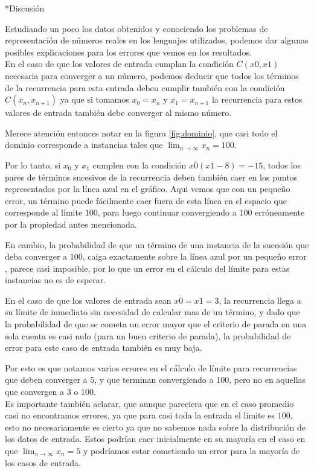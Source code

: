 \documentclass[12pt,titlepage]{article}
\newenvironment{usection}[1]{\newpage\begin{section}*{#1}	\addcontentsline{toc}{section}{#1}}{\end{section}}
\begin{document}
	\begin{usection}{Discusión}

		Estudiando un poco los datos obtenidos
		y conociendo los problemas de representación de números reales
		en los lenguajes utilizados, podemos dar algunas posibles explicaciones
		para los errores que vemos en los resultados. \\

		En el caso de que los valores de entrada cumplan la condición $C(x0,x1)$
		necesaria para converger a un número, podemos deducir que
		todos los términos de la recurrencia para esta entrada
		deben cumplir también con la condición $C(x_n,x_{n+1})$ ya que
		si tomamos $x_0 = x_n$ y $x_1 = x_{n+1}$ la recurrencia
		para estos valores de entrada también debe converger al mismo número.

		Merece atención entonces notar en la figura \ref{fig:dominio},
		que casi todo el dominio corresponde a instancias
		tales que $\lim_{n\to\infty} x_n = 100$. 

		Por lo tanto, si $x_0$ y $x_1$ cumplen con la condición $x0(x1-8) = -15$,
		todos los pares de términos sucesivos de la recurrencia
		deben también caer en los puntos representados
		por la línea azul en el gráfico. Aqui vemos que con un pequeño error,
		un término puede fácilmente caer fuera de esta línea
		en el espacio que corresponde al límite $100$, para luego
		continuar convergiendo a $100$ erróneamente por la propiedad antes mencionada.

		En cambio, la probabilidad de que un término de una instancia
		de la sucesión que deba converger a $100$, caiga exactamente
		sobre la línea azul por un pequeño error , parece casi imposible,
		por lo que un error en el cálculo del límite para estas instancias no es de esperar.

		En el caso de que los valores de entrada sean $x0 = x1 = 3$,
		la recurrencia llega a su límite de inmediato
		sin necesidad de calcular mas de un término,
		y dado que la probabilidad de que se cometa un error
		mayor que el criterio de parada en una sola cuenta es casi nulo
		(para un buen criterio de parada), la probabilidad de error
		para este caso de entrada también es muy baja.

		Por esto es que notamos varios errores en el cálculo de límite
		para recurrencias que deben converger a $5$, y que terminan
		convergiendo a $100$, pero no en aquellas que convergen a $3$ o $100$. \\

		Es importante también aclarar, que aunque pareciera que
		en el caso promedio casi no encontramos errores,
		ya que para casi toda la entrada el limite es $100$,
		esto no necesariamente es cierto ya que no sabemos nada
		sobre la distribución de los datos de entrada.
		Estos podrían caer inicialmente en su mayoría en el caso
		en que $\lim_{n\to\infty} x_n = 5$ y podríamos estar cometiendo
		un error para la mayoría de los casos de entrada.


\end{usection}
\end{document}
